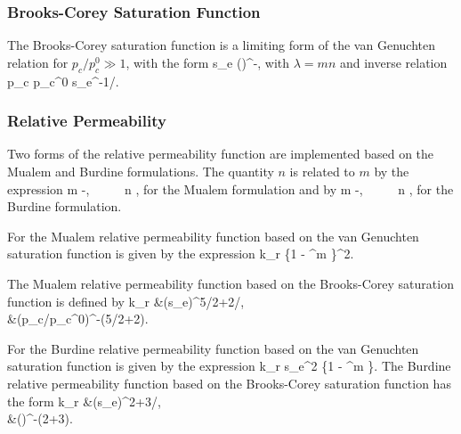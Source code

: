 \subsubsection{Brooks-Corey Saturation Function} 

The Brooks-Corey saturation function is a limiting form of the van Genuchten relation for $p_c/p_c^0 \gg 1$, with the form
\EQ
s_e \eq \left(\right)^{-\lambda},
\EN
with $\lambda=mn$ and inverse relation
\EQ
p_c \eq p_c^0 s_e^{-1/\lambda}.
\EN

\subsubsection{Relative Permeability}

Two forms of the relative permeability function are implemented based on the Mualem and Burdine formulations.
The quantity $n$ is related to $m$ by 
the expression 
\EQ\label{lambda_mualem} 
m -, \ \ \ \ \ n \eq {}, 
\EN 
for the Mualem formulation and by
\EQ\label{lambda_burdine} 
m -, \ \ \ \ \ n \eq {}, 
\EN 
for the Burdine formulation.

For the Mualem relative permeability function based on the van Genuchten saturation function is given by the expression 
\EQ\label{krl_mualem} 
k_{r} \eq {} \left\{1 - ^m \right\}^2. 
\EN 

The Mualem relative permeability function based on the Brooks-Corey saturation function is defined by 
\BA
k_r &\eq \big(s_e\big)^{5/2+2/\lambda},\\
&\eq \big(p_c/p_c^0\big)^{-(5\lambda/2+2)}.
\EA

For the Burdine relative permeability function based on the van Genuchten saturation function is given by the expression
\EQ\label{krl_burdine} 
k_{r} \eq s_e^2 \left\{1 - ^m \right\}. 
\EN 
The Burdine relative permeability function based on the Brooks-Corey saturation function has the form
\BA
k_r &\eq \big(s_e\big)^{2+3/\lambda},\\
&\eq \left(\right)^{-(2+3\lambda)}.
\EA

